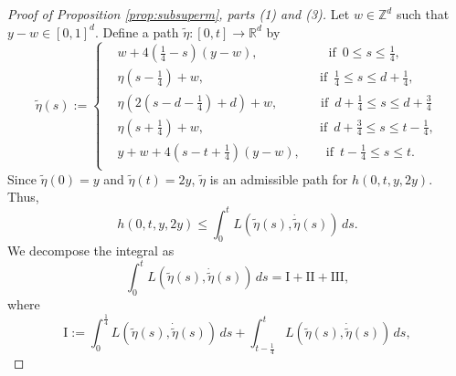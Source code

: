 \documentclass[reqno,11pt]{amsart}
\numberwithin{equation}{section}
\newcommand{\R}{\mathbb{R}} %
\begin{document}
\begin{proof}[Proof of Proposition \ref{prop:subsuperm}, parts (1) and (3)]
Let $w \in \mathbb{Z}^d$ such that $y-w \in [0,1]^d$. Define a path $\tilde{\eta}:[0, t] \to \R^d$ by
\[
    \tilde{\eta}(s):=\left
    \{\begin{aligned}
    &w+ 4\left(\frac{1}{4}-s\right)(y-w), \qquad \qquad  \quad \,\,\, \text{if} \,\, \, 0 \leq s \leq \frac{1}{4},\\
    & \eta \left(s -\frac{1}{4}\right) +w, \qquad \qquad  \qquad \qquad \quad \text{if} \,\, \,\frac{1}{4} \leq s \leq d+\frac{1}{4},\\
    & \eta\left(2\left(s-d-\frac{1}{4}\right)+d\right)+w, \qquad  \quad \,\, \text{if} \,\,\, d+\frac{1}{4} \leq s \leq d +\frac{3}{4}\\
    & \eta \left(s+\frac{1}{4}\right)+w, \qquad \qquad\qquad \qquad \quad \text{if} \,\,\, d+\frac{3}{4} \leq s \leq t-\frac{1}{4},\\
    & y+w +4\left(s-t+\frac{1}{4}\right)\left(y-w\right), \qquad \text{if} \,\,\, t-\frac{1}{4} \leq s \leq t.\\
    \end{aligned}
    \right.
\]
Since $\tilde{\eta}(0)=y$ and $\tilde{\eta}(t)=2y$, $\tilde{\eta}$ is an admissible path for $h(0,t, y, 2y)$. Thus,
\begin{equation}\label{eqn:mltilxi}
h(0,t,y,2y) \leq \int_0^tL \left(\tilde{\eta}(s), \dot{\tilde{\eta}} (s)\right) \, ds.
\end{equation}
We decompose the integral as
\begin{equation}\label{eqn:decomptilxi}
\int_0^tL \left(\tilde{\eta}(s), \dot{\tilde{\eta}} (s)\right) \, ds= \mathrm{I}+\mathrm{II}+\mathrm{III},
\end{equation}
where
\[
\mathrm{I}:=\int_0^\frac{1}{4}L \left(\tilde{\eta}(s), \dot{\tilde{\eta}} (s)\right) \, ds+\int_{t-\frac{1}{4}}^{t}L \left(\tilde{\eta}(s), \dot{\tilde{\eta}} (s)\right) \, ds,
\]


\end{proof}
\end{document}
